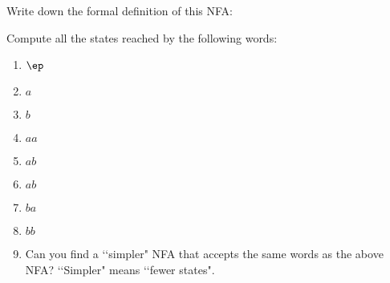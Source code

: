   Write down the formal definition of this NFA:

Compute all the states reached by the following words:
\begin{enumerate}[label=(\alph*)]
\item $\ep$
\item $a$
\item $b$
\item $aa$
\item $ab$
\item $ab$
\item $ba$
\item $bb$
\item Can you find a \lq\lq simpler" NFA that accepts the same words as the above NFA?
  \lq\lq Simpler" means \lq\lq fewer states".
\end{enumerate}
